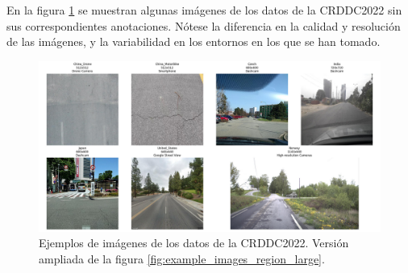 En la figura \ref{fig:example_images_region} se muestran algunas imágenes de los datos de la CRDDC2022 sin sus correspondientes anotaciones. Nótese la diferencia en la calidad y resolución de las imágenes, y la variabilidad en los entornos en los que se han tomado.

\begin{figure}[H]
    \centering
    \includegraphics[width=1\textwidth]{img/example_images_regions.png}
    \caption{Ejemplos de imágenes de los datos de la CRDDC2022. Versión ampliada de la figura \ref{fig:example_images_region_large}.}
    \label{fig:example_images_region}
\end{figure}


